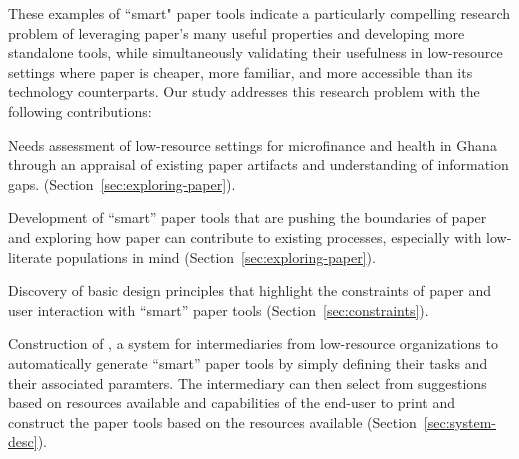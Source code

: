 \documentclass{sig-alternate}
\begin{document}
These examples of ``smart" paper tools indicate a particularly compelling research problem of leveraging paper's many useful properties and developing more standalone tools, while simultaneously validating their usefulness in low-resource settings where paper is cheaper, more familiar, and more accessible than its technology counterparts. Our study addresses this research problem with the following contributions:

\begin{compactitem}

  \item Needs assessment of low-resource settings for microfinance and health in Ghana through an appraisal of existing paper artifacts and understanding of information gaps. (Section~\ref{sec:exploring-paper}).
  \item Development of ``smart'' paper tools that are pushing the boundaries of paper and exploring how paper can contribute to existing processes, especially with low-literate populations in mind (Section~\ref{sec:exploring-paper}).
  \item Discovery of basic design principles that highlight the constraints of paper and user interaction with ``smart'' paper tools (Section~\ref{sec:constraints}).
  \item Construction of \nifty, a system for intermediaries from low-resource organizations to automatically generate ``smart'' paper tools by simply defining their tasks and their associated paramters. The intermediary can then select from suggestions based on resources available and capabilities of the end-user to print and construct the paper tools based on the resources available (Section~\ref{sec:system-desc}). 

\end{compactitem}


\end{document}
